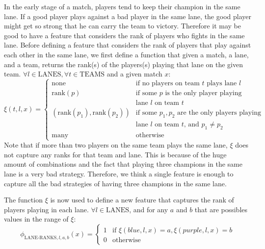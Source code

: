 In the early stage of a match, players tend to keep their champion in the same lane.
If a good player plays against a bad player in the same lane, the good player might get so strong that he can carry the team to victory.
Therefore it may be good to have a feature that considers the rank of players who fights in the same lane.
Before defining a feature that considers the rank of players that play against each other in the same lane,
we first define a function that given a match, a lane, and a team, returns the rank(s) of the players(s) playing that lane on the given team.
$\forall l \in \text{LANES}, \forall t \in \text{TEAMS}$ and a given match $x$:
\begin{equation}\label{eq:xi}
  \xi(t,l,x) =
\begin{cases} 
  \text{none} & \text{if no players on team } t \text{ plays lane } l\\
  \text{rank}(p) & \text{if some } p \text{ is the only player playing}\\
  & \text{lane } l \text{ on team } t\\
  (\text{rank}(p_1), \text{rank}(p_2)) & \text{if some } p_1, p_2 \text{ are the only players playing}\\
                        & \text{lane }l \text{ on team } t \text{, and } p_1 \neq p_2\\
  \text{many} & \text{otherwise}
\end{cases}
\end{equation}
Note that if more than two players on the same team plays the same lane, $\xi$ does not capture any ranks for that team and lane. This is because of the huge amount of combinations and the fact that playing three champions in the same lane is a very bad strategy. Therefore, we think a single feature is enough to capture all the bad strategies of having three champions in the same lane.
 
The function $\xi$ is now used to define a new feature that captures the rank of players playing in each lane.
$\forall l \in \text{LANES}$, and for any $a$ and $b$ that are possibles values in the range of $\xi$:
\begin{equation}\label{eq:laneranks}
\phi_{\text{LANE-RANKS},l,a,b}(x) =
\begin{cases} 
  1 & \text{if } \xi(\textit{blue},l,x) = a, \xi(\textit{purple},l,x) = b\\
  0 & \text{otherwise} 
\end{cases}  
\end{equation}

